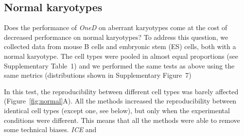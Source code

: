 \documentclass[a4,center,fleqn]{NAR}
\providecommand{\DIFadd}[1]{{\protect\color{red}#1}} %
\providecommand{\DIFdel}[1]{{\protect}}                      %
\providecommand{\DIFaddbegin}{} %
\providecommand{\DIFaddend}{} %
\providecommand{\DIFdelbegin}{} %
\providecommand{\DIFdelend}{} %
\begin{document}
\DIFdelend \subsection{Normal karyotypes}

Does the performance of \textit{OneD} on aberrant karyotypes come at the
cost of decreased performance on normal karyotypes? To address this
question, we \DIFdelbegin \DIFdel{assembled another data set comprised of }\DIFdelend \DIFaddbegin \DIFadd{collected data from }\DIFaddend mouse B cells and embryonic stem (ES)
cells, both with a normal karyotype. The cell types were pooled in almost
equal proportions (see \DIFdelbegin \DIFdel{Table~\ref{tab:samples}) and }\DIFdelend \DIFaddbegin \DIFadd{Supplementary Table~1) and we performed }\DIFaddend the same
tests as above \DIFdelbegin \DIFdel{were performed.
}\DIFdelend \DIFaddbegin \DIFadd{using the same metrics (distributions shown in
Supplementary Figure~7)
}\DIFaddend 

In \DIFdelbegin \DIFdel{these conditions, the experimental protocol had a strong effect on the
impact of the different normalization methods }\DIFdelend \DIFaddbegin \DIFadd{this test, the reproducibility between different cell types was barely
affected }\DIFaddend (Figure~\ref{fig:normal}A). \DIFdelbegin \DIFdel{For instance, }\textit{\DIFdel{caICB}} %
\DIFdel{and }\textit{\DIFdel{ICE}} %
\DIFdel{increased the
similarity
when the protocols were different, but decreased it when the protocols
were the same. The effect was stronger when comparing }\DIFdelend \DIFaddbegin \DIFadd{All the methods increased the
reproducibility between }\DIFaddend identical cell types \DIFdelbegin \DIFdel{, but the same trend appeared when comparing differentcell types,
indicating that these methods may enhance or reduce biological variation,
depending on the context. Once more, }\textit{\DIFdel{vanilla}} %
\DIFdel{followed the same
trend as }\textit{\DIFdel{ICE}} %
\DIFdel{but to a lesser extent. The }\DIFdelend \DIFaddbegin \DIFadd{(except one, see below), but
only when the experimental conditions were different. This means that all
the methods were able to remove some technical biases. }\DIFaddend \textit{\DIFdelbegin \DIFdel{LGF}\DIFdelend \DIFaddbegin \DIFadd{ICE}\DIFaddend } \DIFdelbegin \DIFdel{method
increased the similarity when comparing the same cells with different
experimental protocols, }\DIFdelend and
\DIFdelbegin \DIFdel{had little to no effect in the other cases. This indicates that }\textit{\DIFdel{LGF}} %
\DIFdel{is a safe choice in this case.
}%
\end{document}
